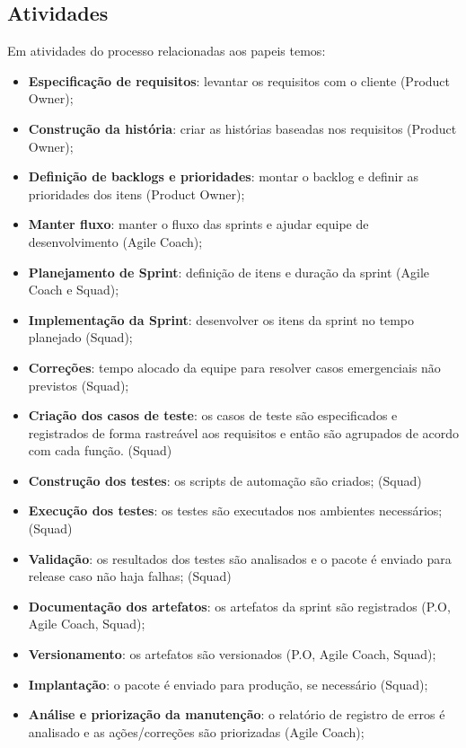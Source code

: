 \documentclass[	DIV=calc,%
							paper=a4,%
							fontsize=12pt,%
							onecolumn]{scrartcl}	 					%
\begin{document}
\subsection{Atividades}
Em atividades do processo relacionadas aos papeis temos: 
\begin{itemize}
	\item \textbf{Especificação de requisitos}: levantar os requisitos com o cliente (Product Owner); 
	
	\item \textbf{Construção da história}: criar as histórias baseadas nos requisitos (Product Owner);  
	
	\item \textbf{Definição de backlogs e prioridades}: montar o backlog e definir as prioridades dos itens (Product Owner); 
	
	\item \textbf{Manter fluxo}: manter o fluxo das sprints e ajudar equipe de desenvolvimento (Agile Coach); 
	
	\item \textbf{Planejamento de Sprint}: definição de itens e duração da sprint (Agile Coach e Squad); 
	
	\item \textbf{Implementação da Sprint}: desenvolver os itens da sprint no tempo planejado (Squad); 
	
	\item \textbf{Correções}: tempo alocado da equipe para resolver casos emergenciais não previstos (Squad); 
	
	\item \textbf{Criação dos casos de teste}: os casos de teste são especificados e registrados de forma rastreável aos requisitos e então são agrupados de acordo com cada função. (Squad) 
	
	\item \textbf{Construção dos testes}: os scripts de automação são criados; (Squad) 
	
	\item \textbf{Execução dos testes}: os testes são executados nos ambientes necessários; (Squad) 
	
	\item \textbf{Validação}: os resultados dos testes são analisados e o pacote é enviado para release caso não haja falhas; (Squad) 
	
	\item \textbf{Documentação dos artefatos}: os artefatos da sprint são registrados (P.O, Agile Coach, Squad); 
	
	\item \textbf{Versionamento}: os artefatos são versionados (P.O, Agile Coach, Squad); 
	
	\item \textbf{Implantação}: o pacote é enviado para produção, se necessário (Squad); 
	
	\item \textbf{Análise e priorização da manutenção}: o relatório de registro de erros é analisado e as ações/correções são priorizadas (Agile Coach); 
\end{itemize}
\end{document}
